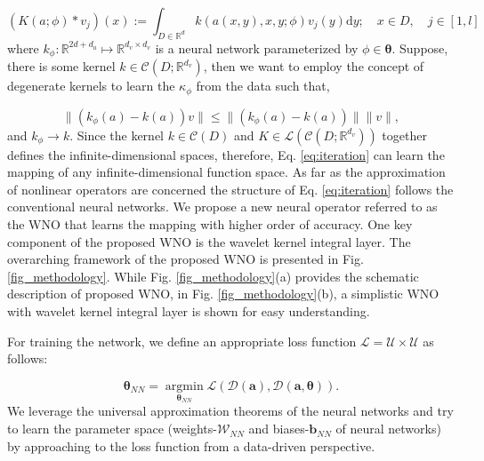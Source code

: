 \documentclass{article}
\begin{document}
\begin{equation}\label{eq:integral}
    \left(K(a ; \phi) * v_{j}\right)(x):=\int_{D \in \mathbb{R}^{d}} k \left(a(x,y), x, y; \phi \right) v_{j}(y) \mathrm{d} y; \quad x \in D, \quad j \in [1,l]
\end{equation}
where $k_{\phi}: \mathbb{R}^{2d+d_{a}} \mapsto \mathbb{R}^{d_{v} \times d_{v}}$ is a neural network parameterized by $\phi \in {\bm{\theta}}$. Suppose, there is some kernel $k \in \mathcal{C}\left(D; \mathbb{R}^{d_v} \right)$, then we want to employ the concept of degenerate kernels to learn the $\kappa_{\phi}$ from the data such that, 

\begin{equation}\label{eq:converge}
    \| \left( k_{\phi}(a) - k(a) \right) v \| \le \| \left( k_{\phi}(a) - k(a) \right) \| \|v \|,
\end{equation}
and $k_{\phi} \to k$. Since the kernel $k \in \mathcal{C}(D)$ and $K \in \mathcal{L}(\mathcal{C}(D;\mathbb{R}^{d_v}))$ together defines the infinite-dimensional spaces, therefore, Eq. \eqref{eq:iteration} can learn the mapping of any infinite-dimensional function space. As far as the approximation of nonlinear operators are concerned the structure of Eq. \eqref{eq:iteration} follows the conventional neural networks. We propose a new neural operator referred to as the WNO that learns the mapping with higher order of accuracy. One key component of the proposed WNO is the wavelet kernel integral layer.
The overarching framework of the proposed WNO is presented in Fig. \ref{fig_methodology}. While Fig. \ref{fig_methodology}(a) provides the schematic description of proposed WNO, in Fig. \ref{fig_methodology}(b), a simplistic WNO with wavelet kernel integral layer is shown for easy understanding.

For training the network, we define an appropriate loss function $\mathcal{L} = \mathcal{U} \times \mathcal{U}$ as follows:

\begin{equation}
    {\bm{\theta}}_{NN} = \mathop {\arg \min}\limits_{{\bm{\theta}}_{NN}} \mathcal{L} \left(\mathcal{D}({\bm{a}}), \mathcal{D}(\bm{a}, \bm{\theta}) \right).
\end{equation}
We leverage the universal approximation theorems of the neural networks \cite{hornik1989multilayer,chen1995universal} and try to learn the parameter space (weights-$\mathcal{W}_{NN}$ and biases-$\bm{b}_{NN}$ of neural networks) by approaching to the loss function from a data-driven perspective. 
\end{document}
